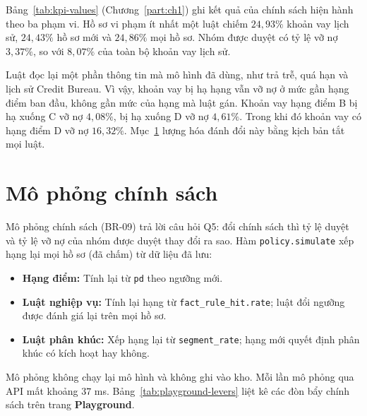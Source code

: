 \medskip

Bảng~\ref{tab:kpi-values} (Chương~\ref{part:ch1}) ghi kết quả của chính sách hiện hành theo ba phạm vi. Hồ sơ vi phạm ít nhất một luật chiếm $24{,}93\%$ khoản vay lịch sử, $24{,}43\%$ hồ sơ mới và $24{,}86\%$ mọi hồ sơ. Nhóm được duyệt có tỷ lệ vỡ nợ $3{,}37\%$, so với $8{,}07\%$ của toàn bộ khoản vay lịch sử.

\medskip

Luật đọc lại một phần thông tin mà mô hình đã dùng, như trả trễ, quá hạn và lịch sử Credit Bureau. Vì vậy, khoản vay bị hạ hạng vẫn vỡ nợ ở mức gần hạng điểm ban đầu, không gần mức của hạng mà luật gán. Khoản vay hạng điểm B bị hạ xuống C vỡ nợ $4{,}08\%$, bị hạ xuống D vỡ nợ $4{,}61\%$. Trong khi đó khoản vay có hạng điểm D vỡ nợ $16{,}32\%$. Mục~\ref{sec:dss-simulation} lượng hóa đánh đổi này bằng kịch bản tắt mọi luật.

\section{Mô phỏng chính sách}
\label{sec:dss-simulation}

Mô phỏng chính sách (BR-09) trả lời câu hỏi Q5: đổi chính sách thì tỷ lệ duyệt và tỷ lệ vỡ nợ của nhóm được duyệt thay đổi ra sao. Hàm \texttt{policy.simulate} xếp hạng lại mọi hồ sơ (đã chấm) từ dữ liệu đã lưu:
\begin{itemize}[topsep=0pt, itemsep=1pt]
	\item \textbf{Hạng điểm:} Tính lại từ \texttt{pd} theo ngưỡng mới.
	\item \textbf{Luật nghiệp vụ:} Tính lại hạng từ \texttt{fact\_rule\_hit.rate}; luật đổi ngưỡng được đánh giá lại trên mọi hồ sơ.
	\item \textbf{Luật phân khúc:} Xếp hạng lại từ \texttt{segment\_rate}; hạng mới quyết định phân khúc có kích hoạt hay không.
\end{itemize}

Mô phỏng không chạy lại mô hình và không ghi vào kho. Mỗi lần mô phỏng qua API mất khoảng $37$ ms. Bảng~\ref{tab:playground-levers} liệt kê các đòn bẩy chính sách trên trang \textbf{Playground}.

